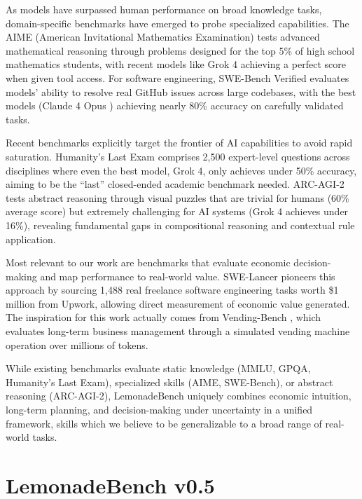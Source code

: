 \documentclass[11pt]{article}
\begin{document}
As models have surpassed human performance on broad knowledge tasks, domain-specific benchmarks have emerged to probe specialized capabilities.
The AIME (American Invitational Mathematics Examination) tests advanced mathematical reasoning through problems designed for the top 5\% of high school mathematics students, with recent models like Grok 4 \cite{grok4_xai_2025} achieving a perfect score when given tool access.
For software engineering, SWE-Bench Verified \cite{chowdhury2024swebenchverified} evaluates models' ability to resolve real GitHub issues across large codebases, with the best models (Claude 4 Opus \cite{anthropic2025claude4}) achieving nearly 80\% accuracy on carefully validated tasks.

Recent benchmarks explicitly target the frontier of AI capabilities to avoid rapid saturation.
Humanity's Last Exam \cite{phan2025humanitysexam} comprises 2,500 expert-level questions across disciplines where even the best model, Grok 4, only achieves under 50\% accuracy, aiming to be the ``last'' closed-ended academic benchmark needed.
ARC-AGI-2 \cite{chollet2025arcagi2newchallengefrontier} tests abstract reasoning through visual puzzles that are trivial for humans (60\% average score) but extremely challenging for AI systems (Grok 4 achieves under 16\%), revealing fundamental gaps in compositional reasoning and contextual rule application.

Most relevant to our work are benchmarks that evaluate economic decision-making and map performance to real-world value.
SWE-Lancer \cite{miserendino2025swelancer} pioneers this approach by sourcing 1,488 real freelance software engineering tasks worth \$1 million from Upwork, allowing direct measurement of economic value generated.
The inspiration for this work actually comes from Vending-Bench \cite{andonlabs2025vendingbench}, which evaluates long-term business management through a simulated vending machine operation over millions of tokens.

While existing benchmarks evaluate static knowledge (MMLU, GPQA, Humanity's Last Exam), specialized skills (AIME, SWE-Bench), or abstract reasoning (ARC-AGI-2), LemonadeBench uniquely combines economic intuition, long-term planning, and decision-making under uncertainty in a unified framework, skills which we believe to be generalizable to a broad range of real-world tasks.

\section{LemonadeBench v0.5}
\end{document}
